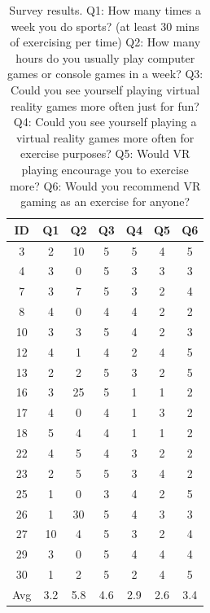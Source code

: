 \documentclass{sig-alternate-05-2015}
\begin{document}
\begin{table}
\centering
\caption
{
    Survey results.\newline
    Q1: How many times a week you do sports? (at least 30 mins of exercising per time)\newline
    Q2: How many hours do you usually play computer games or console games in a week?\newline
    Q3: Could you see yourself playing virtual reality games more often just for fun?\newline
    Q4: Could you see yourself playing a virtual reality games more often for exercise purposes?\newline
    Q5: Would VR playing encourage you to exercise more?\newline
    Q6: Would you recommend VR gaming as an exercise for anyone?\newline
}
\begin{tabular}{c|c c c c c c} \hline
    ID&Q1&Q2&Q3&Q4&Q5&Q6 \\ \hline
    3&2&10&5&5&4&5\\
    4&3&0&5&3&3&3\\
    7&3&7&5&3&2&4\\
    8&4&0&4&4&2&2\\
    10&3&3&5&4&2&3\\
    12&4&1&4&2&4&5\\
    13&2&2&5&3&2&5\\
    16&3&25&5&1&1&2\\
    17&4&0&4&1&3&2\\
    18&5&4&4&1&1&2\\
    22&4&5&4&3&2&2\\
    23&2&5&5&3&4&2\\
    25&1&0&3&4&2&5\\
    26&1&30&5&4&3&3\\
    27&10&4&5&3&2&4\\
    29&3&0&5&4&4&4\\
    30&1&2&5&2&4&5\\ \hline
    Avg&3.2&5.8&4.6&2.9&2.6&3.4
\end{tabular}
\end{table}
\end{document}
